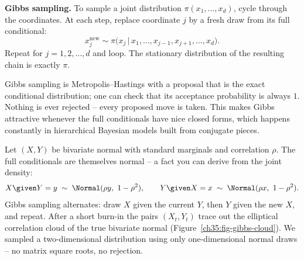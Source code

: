 \begin{formalbox}
\textbf{Gibbs sampling.} To sample a joint distribution
$\pi(x_1, \dots, x_d)$, cycle through the coordinates. At each step, replace
coordinate $j$ by a fresh draw from its full conditional:
\[
  x_j^{\text{new}} \sim \pi\bigl(x_j \,\big|\, x_1,\dots,x_{j-1},
     x_{j+1},\dots,x_d\bigr).
\]
Repeat for $j = 1, 2, \dots, d$ and loop. The stationary distribution of the
resulting chain is exactly $\pi$.
\end{formalbox}

Gibbs sampling is Metropolis--Hastings with a proposal that is the exact
conditional distribution; one can check that its acceptance probability is always
$1$. Nothing is ever rejected -- every proposed move is taken. This makes Gibbs
attractive whenever the full conditionals have nice closed forms, which happens
constantly in hierarchical Bayesian models built from conjugate pieces.

\begin{example}
\label{ch35:ex-gibbs}
Let $(X, Y)$ be bivariate normal with standard marginals and correlation $\rho$.
The full conditionals are themselves normal -- a fact you can derive from the
joint density:
\[
  X \given Y = y \;\sim\; \Normal(\rho y,\ 1 - \rho^2), \qquad
  Y \given X = x \;\sim\; \Normal(\rho x,\ 1 - \rho^2).
\]
Gibbs sampling alternates: draw $X$ given the current $Y$, then $Y$ given the new
$X$, and repeat. After a short burn-in the pairs $(X_t, Y_t)$ trace out the
elliptical correlation cloud of the true bivariate normal
(Figure~\ref{ch35:fig-gibbs-cloud}). We sampled a
two-dimensional distribution using only one-dimensional normal draws -- no matrix
square roots, no rejection.
\end{example}

